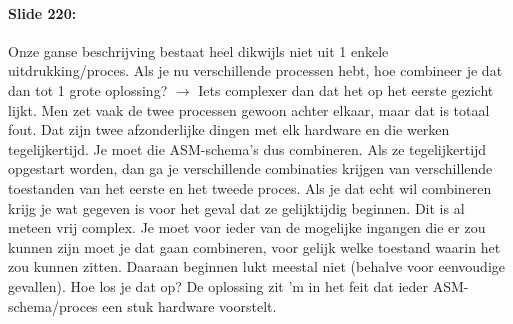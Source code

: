 \documentclass[10pt,a4paper]{book}
\begin{document}
\paragraph{Slide 220:} Onze ganse beschrijving bestaat heel dikwijls niet uit 1 enkele uitdrukking/proces. Als je nu verschillende processen hebt, hoe combineer je dat dan tot 1 grote oplossing? $\rightarrow$ Iets complexer dan dat het op het eerste gezicht lijkt. Men zet vaak de twee processen gewoon achter elkaar, maar dat is totaal fout. Dat zijn twee afzonderlijke dingen met elk hardware en die werken tegelijkertijd. Je moet die ASM-schema's dus combineren. Als ze tegelijkertijd opgestart worden, dan ga je verschillende combinaties krijgen van verschillende toestanden van het eerste en het tweede proces. Als je dat echt wil combineren krijg je wat gegeven is voor het geval dat ze gelijktijdig beginnen. Dit is al meteen vrij complex. Je moet voor ieder van de mogelijke ingangen die er zou kunnen zijn moet je dat gaan combineren, voor gelijk welke toestand waarin het zou kunnen zitten. Daaraan beginnen lukt meestal niet (behalve voor eenvoudige gevallen). Hoe los je dat op? De oplossing zit 'm in het feit dat ieder ASM-schema/proces een stuk hardware voorstelt.
\end{document}
